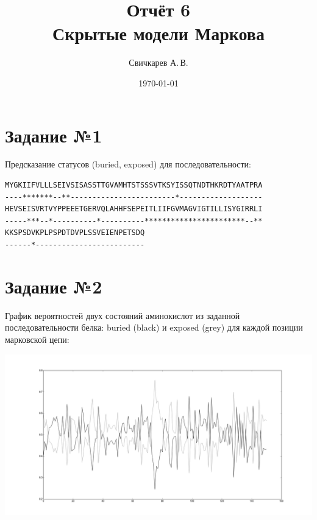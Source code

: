 \documentclass{article} %
\title{Отчёт 6\protect\\Скрытые модели Маркова} %
\author{Свичкарев А.\,В.} %
\date{\today} %
\begin{document}

\maketitle %

\section{Задание №1}
Предсказание статусов (buried, exposed) для последовательности:

\begin{verbatim}
MYGKIIFVLLLSEIVSISASSTTGVAMHTSTSSSVTKSYISSQTNDTHKRDTYAATPRA
----*******--**------------------------*-------------------
HEVSEISVRTVYPPEEETGERVQLAHHFSEPEITLIIFGVMAGVIGTILLISYGIRRLI
-----***--*----------*----------***********************--**
KKSPSDVKPLPSPDTDVPLSSVEIENPETSDQ
------*-------------------------
\end{verbatim}

\section{Задание №2}
График вероятностей двух состояний аминокислот из заданной последовательности белка: buried (black) и exposed (grey) для каждой позиции марковской цепи:

\includegraphics[width=\textwidth]{figure_1}
\end{document}
